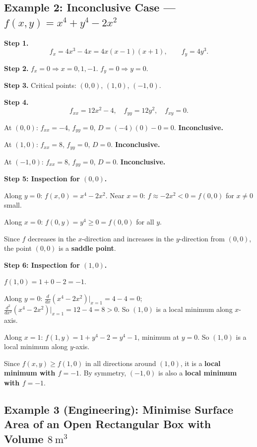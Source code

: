 \documentclass[12pt,a4paper]{article}
\begin{document}
\subsection*{Example 2: Inconclusive Case --- $f(x,y) = x^{4} + y^{4} - 2x^{2}$}

\textbf{Step 1.}
\[
  f_x = 4x^{3} - 4x = 4x(x-1)(x+1), \qquad f_y = 4y^{3}.
\]

\textbf{Step 2.} $f_x = 0 \Rightarrow x = 0, 1, -1$. \quad $f_y = 0 \Rightarrow y = 0$.

\textbf{Step 3.} Critical points: $(0,0)$, $(1,0)$, $(-1,0)$.

\textbf{Step 4.}
\[
  f_{xx} = 12x^{2} - 4, \quad f_{yy} = 12y^{2}, \quad f_{xy} = 0.
\]

At $(0,0)$: $f_{xx} = -4$, $f_{yy} = 0$, $D = (-4)(0) - 0 = 0$. \textbf{Inconclusive.}

At $(1,0)$: $f_{xx} = 8$, $f_{yy} = 0$, $D = 0$. \textbf{Inconclusive.}

At $(-1,0)$: $f_{xx} = 8$, $f_{yy} = 0$, $D = 0$. \textbf{Inconclusive.}

\textbf{Step 5: Inspection for $(0,0)$.}

Along $y = 0$: $f(x,0) = x^{4} - 2x^{2}$. Near $x = 0$: $f \approx -2x^{2} < 0 = f(0,0)$ for $x \neq 0$ small.

Along $x = 0$: $f(0,y) = y^{4} \geq 0 = f(0,0)$ for all $y$.

Since $f$ decreases in the $x$-direction and increases in the $y$-direction from $(0,0)$, the point $(0,0)$ is a \textbf{saddle point}.

\textbf{Step 6: Inspection for $(1,0)$.}

$f(1,0) = 1 + 0 - 2 = -1$.

Along $y = 0$: $\frac{d}{dx}(x^{4}-2x^{2})\big|_{x=1} = 4-4 = 0$; $\frac{d^{2}}{dx^{2}}(x^{4}-2x^{2})\big|_{x=1} = 12-4 = 8 > 0$. So $(1,0)$ is a local minimum along $x$-axis.

Along $x = 1$: $f(1,y) = 1 + y^{4} - 2 = y^{4} - 1$, minimum at $y=0$. So $(1,0)$ is a local minimum along $y$-axis.

Since $f(x,y) \geq f(1,0)$ in all directions around $(1,0)$, it is a \textbf{local minimum with $f = -1$}. By symmetry, $(-1,0)$ is also a \textbf{local minimum with $f = -1$}.

\subsection*{Example 3 (Engineering): Minimise Surface Area of an Open Rectangular Box with Volume $8\ \mathrm{m}^{3}$}
\end{document}
